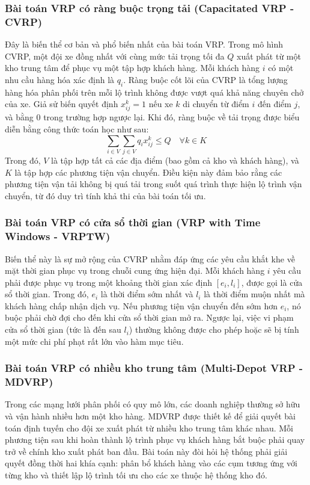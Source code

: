 \documentclass[12pt,a4paper]{article}
\numberwithin{figure}{subsection}
\renewcommand{\le}{\leqslant}
\begin{document}
\subsubsection{Bài toán VRP có ràng buộc trọng tải (Capacitated VRP - CVRP)}Đây là biến thể cơ bản và phổ biến nhất của bài toán VRP. Trong mô hình CVRP, một đội xe đồng nhất với cùng mức tải trọng tối đa $Q$ xuất phát từ một kho trung tâm để phục vụ một tập hợp khách hàng. Mỗi khách hàng $i$ có một nhu cầu hàng hóa xác định là $q_i$. Ràng buộc cốt lõi của CVRP là tổng lượng hàng hóa phân phối trên mỗi lộ trình không được vượt quá khả năng chuyên chở của xe. Giả sử biến quyết định $x_{ij}^k = 1$ nếu xe $k$ di chuyển từ điểm $i$ đến điểm $j$, và bằng 0 trong trường hợp ngược lại. Khi đó, ràng buộc về tải trọng được biểu diễn bằng công thức toán học như sau:
$$ \sum_{i \in V} \sum_{j \in V} q_i x_{ij}^k \le Q \quad \forall k \in K $$
Trong đó, $V$ là tập hợp tất cả các địa điểm (bao gồm cả kho và khách hàng), và $K$ là tập hợp các phương tiện vận chuyển. Điều kiện này đảm bảo rằng các phương tiện vận tải không bị quá tải trong suốt quá trình thực hiện lộ trình vận chuyển, từ đó duy trì tính khả thi của bài toán tối ưu.

\subsubsection{Bài toán VRP có cửa sổ thời gian (VRP with Time Windows - VRPTW)}Biến thể này là sự mở rộng của CVRP nhằm đáp ứng các yêu cầu khắt khe về mặt thời gian phục vụ trong chuỗi cung ứng hiện đại. Mỗi khách hàng $i$ yêu cầu phải được phục vụ trong một khoảng thời gian xác định $[e_i, l_i]$, được gọi là cửa sổ thời gian. Trong đó, $e_i$ là thời điểm sớm nhất và $l_i$ là thời điểm muộn nhất mà khách hàng chấp nhận dịch vụ. Nếu phương tiện vận chuyển đến sớm hơn $e_i$, nó buộc phải chờ đợi cho đến khi cửa sổ thời gian mở ra. Ngược lại, việc vi phạm cửa sổ thời gian (tức là đến sau $l_i$) thường không được cho phép hoặc sẽ bị tính một mức chi phí phạt rất lớn vào hàm mục tiêu.

\subsubsection{Bài toán VRP có nhiều kho trung tâm (Multi-Depot VRP - MDVRP)}Trong các mạng lưới phân phối có quy mô lớn, các doanh nghiệp thường sở hữu và vận hành nhiều hơn một kho hàng. MDVRP được thiết kế để giải quyết bài toán định tuyến cho đội xe xuất phát từ nhiều kho trung tâm khác nhau. Mỗi phương tiện sau khi hoàn thành lộ trình phục vụ khách hàng bắt buộc phải quay trở về chính kho xuất phát ban đầu. Bài toán này đòi hỏi hệ thống phải giải quyết đồng thời hai khía cạnh: phân bổ khách hàng vào các cụm tương ứng với từng kho và thiết lập lộ trình tối ưu cho các xe thuộc hệ thống kho đó.
\end{document}
